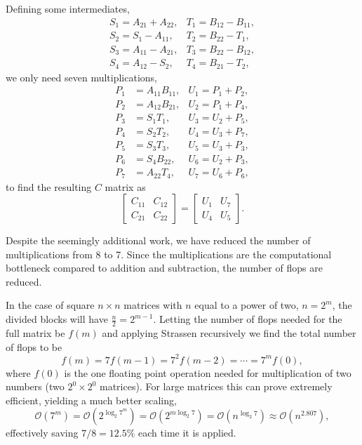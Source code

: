 Defining some intermediates,
\begin{equation}
\label{eq:OpenCL:Strassen_intermediates}
\begin{matrix}
S_1 = A_{21} + A_{22}, & T_1 = B_{12} - B_{11},\\
S_2 = S_1 - A_{11}, & T_2 = B_{22} - T_1,\\
S_3 = A_{11} - A_{21}, & T_3 = B_{22} - B_{12},\\
S_4 = A_{12} - S_2, & T_4 = B_{21} - T_2 ,
\end{matrix}
\end{equation}
we only need seven multiplications,
\begin{equation}
\label{eq:OpenCL:Strassen_multiplications}
\begin{matrix}
P_1 &= A_{11} B_{11}, & U_1 = P_1 + P_2, \\
P_2 &= A_{12} B_{21}, & U_2 = P_1 + P_4, \\
P_3 &= S_1 T_1, & U_3 = U_2 + P_5,\\
P_4 &= S_2 T_2, & U_4 = U_3 + P_7,\\
P_5 &= S_3 T_3, & U_5 = U_3 + P_3,\\
P_6 &= S_4 B_{22}, & U_6 = U_2 + P_3,\\
P_7 &= A_{22} T_4, & U_7 = U_6 + P_6 ,
\end{matrix} 
\end{equation}
to find the resulting $C$ matrix as
\begin{equation}
\begin{bmatrix}
C_{11} & C_{12} \\
C_{21} & C_{22}
\end{bmatrix}
=
\begin{bmatrix}
U_1 & U_7 \\
U_4 & U_5 
\end{bmatrix}
.
\end{equation}


Despite the seemingly additional work, we have reduced the number of multiplications from 8 to 7. Since the multiplications are the computational bottleneck compared to addition and subtraction, the number of flops are reduced.

In the case of square $n\times n$ matrices with $n$ equal to a power of two, $n=2^m$, the divided blocks will have $\frac{n}{2} = 2^{m-1}$.
Letting the number of flops needed for the full matrix be $f(m)$ and applying Strassen recursively we find the total number of flops to be
\begin{equation}
f(m) = 7 f(m-1) = 7^2 f(m-2) = \cdots = 7^m f(0) , 
\end{equation}
where $f(0)$ is the one floating point operation needed for multiplication of two numbers (two $2^0\times 2^0$ matrices).
For large matrices this can prove extremely efficient, yielding a much better scaling, 
\begin{equation}
\mathcal{O}\left( 7^m \right) = 
\mathcal{O}\left( 2^{\log_2 7^m} \right) = 
\mathcal{O}\left( 2^{m \log_2 7} \right) = 
\mathcal{O}\left( n^{\log_2 7} \right) \approx
\mathcal{O}\left( n^{2.807} \right) ,
\end{equation}
effectively saving $7/8 = 12.5\%$ each time it is applied.






